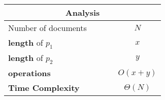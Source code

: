 \begin{table}[h]
    \begin{minipage}[t]{0.65\linewidth}
        \begin{algorithm}[H]
            \caption{INTERSECT: inverted index posting}
        
        \end{algorithm}        
    \end{minipage}
    \hfill
    \begin{minipage}[t]{0.35\linewidth}
        \begin{table}[H]
            \centering
            \begin{tabular}{|p{0.7\linewidth}|c|}
                \hline

                \multicolumn{2}{|c|}{\textbf{Analysis}}\\
                \hline\hline

                Number of documents & $N$\\
                \hline

                \textbf{length} of $p_1$ & $x$ \\
                \hline

                \textbf{length} of $p_2$ & $y$ \\
                \hline\hline
                
                \textbf{operations} & $O(x+y)$ \\
                \hline
                
                \textbf{Time Complexity} & $\Theta(N)$ \\
                \hline
                 
            \end{tabular}
        \end{table}
    \end{minipage}
\end{table}


